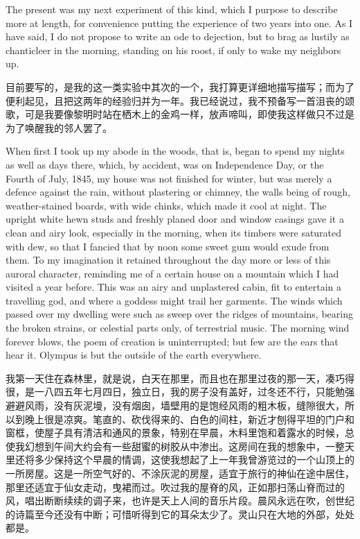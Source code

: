 {The present was my next experiment of this kind, which I purpose to describe more at length, for convenience putting the experience of two years into one. As I have said, I do not propose to write an ode to dejection, but to brag as lustily as chanticleer in the morning, standing on his roost, if only to wake my neighbors up.

目前要写的，是我的这一类实验中其次的一个，我打算更详细地描写描写；而为了便利起见，且把这两年的经验归并为一年。我已经说过，我不预备写一首沮丧的颂歌，可是我要像黎明时站在栖木上的金鸡一样，放声啼叫，即使我这样做只不过是为了唤醒我的邻人罢了。


When first I took up my abode in the woods, that is, began to spend my nights as well as days there, which, by accident, was on Independence Day, or the Fourth of July, 1845, my house was not finished for winter, but was merely a defence against the rain, without plastering or chimney, the walls being of rough, weather-stained boards, with wide chinks, which made it cool at night. The upright white hewn studs and freshly planed door and window casings gave it a clean and airy look, especially in the morning, when its timbers were saturated with dew, so that I fancied that by noon some sweet gum would exude from them. To my imagination it retained throughout the day more or less of this auroral character, reminding me of a certain house on a mountain which I had visited a year before. This was an airy and unplastered cabin, fit to entertain a travelling god, and where a goddess might trail her garments. The winds which passed over my dwelling were such as sweep over the ridges of mountains, bearing the broken strains, or celestial parts only, of terrestrial music. The morning wind forever blows, the poem of creation is uninterrupted; but few are the ears that hear it. Olympus is but the outside of the earth everywhere.

我第一天住在森林里，就是说，白天在那里，而且也在那里过夜的那一天，凑巧得很，是一八四五年七月四日，独立日，我的房子没有盖好，过冬还不行，只能勉强避避风雨，没有灰泥墁，没有烟囱，墙壁用的是饱经风雨的粗木板，缝隙很大，所以到晚上很是凉爽。笔直的、砍伐得来的、白色的间柱，新近才刨得平坦的门户和窗框，使屋子具有清洁和通风的景象，特别在早晨，木料里饱和着露水的时候，总使我幻想到午间大约会有一些甜蜜的树胶从中渗出。这房间在我的想象中，一整天里还将多少保持这个早晨的情调，这使我想起了上一年我曾游览过的一个山顶上的一所房屋。这是一所空气好的、不涂灰泥的房屋，适宜于旅行的神仙在途中居住，那里还适宜于仙女走动，曳裙而过。吹过我的屋脊的风，正如那扫荡山脊而过的风，唱出断断续续的调子来，也许是天上人间的音乐片段。晨风永远在吹，创世纪的诗篇至今还没有中断；可惜听得到它的耳朵太少了。灵山只在大地的外部，处处都是。
}